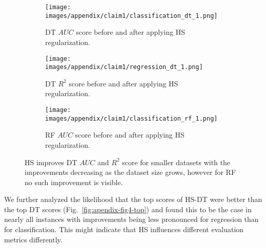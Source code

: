 \begin{figure}[hbt]
    \centering
    \begin{subfigure}[b]{\textwidth}
        \centering
        \texttt{[image: images/appendix/claim1/classification\_dt\_1.png]}
        \caption{DT $AUC$ score before and after applying HS regularization.}
    \end{subfigure}
    \vspace{-1em}
    
    \begin{subfigure}[b]{\textwidth}
        \centering
        \texttt{[image: images/appendix/claim1/regression\_dt\_1.png]}
        \caption{DT $R^2$ score before and after applying HS regularization.}
    \end{subfigure}
    \vspace{-1em}
    
    \begin{subfigure}[b]{\textwidth}
        \centering
        \texttt{[image: images/appendix/claim1/classification\_rf\_1.png]}
        \caption{RF $AUC$ score before and after applying HS regularization.}
    \end{subfigure}
    \caption{HS improves DT $AUC$ and $R^2$ score for smaller datasets with the improvements decreasing as the dataset size grows, however for RF no such improvement is visible.}
    \label{fig:apendix-fig4-claim1}
\end{figure}

We further analyzed the likelihood that the top scores of HS-DT were better than the top DT scores (Fig.~\ref{fig:apendix-fig4-top}) and found this to be the case in nearly all instances with improvements being less pronounced for regression than for classification. 
This might indicate that HS influences different evaluation metrics differently.

